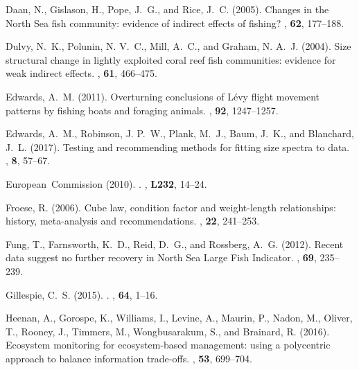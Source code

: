 \begin{thebibliography}{}
Daan, N., Gislason, H., Pope, J.~G., and Rice, J.~C. (2005).
\newblock Changes in the {N}orth {S}ea fish community: evidence of indirect
  effects of fishing?
, {\bf 62}, 177--188.

Dulvy, N.~K., Polunin, N. V.~C., Mill, A.~C., and Graham, N. A.~J. (2004).
\newblock Size structural change in lightly exploited coral reef fish
  communities: evidence for weak indirect effects.
, {\bf 61}, 466--475.

Edwards, A.~M. (2011).
\newblock Overturning conclusions of {{L}}\'evy flight movement patterns by
  fishing boats and foraging animals.
, {\bf 92}, 1247--1257.

Edwards, A.~M., Robinson, J. P.~W., Plank, M.~J., Baum, J.~K., and Blanchard,
  J.~L. (2017).
\newblock Testing and recommending methods for fitting size spectra to data.
, {\bf 8}, 57--67.

{European~Commission} (2010).
.
, {\bf L232}, 14--24.

Froese, R. (2006).
\newblock Cube law, condition factor and weight-length relationships: history,
  meta-analysis and recommendations.
, {\bf 22}, 241--253.

Fung, T., Farnsworth, K.~D., Reid, D.~G., and Rossberg, A.~G. (2012).
\newblock Recent data suggest no further recovery in {N}orth {S}ea {L}arge
  {F}ish {I}ndicator.
, {\bf 69}, 235--239.

Gillespie, C.~S. (2015).
.
, {\bf 64}, 1--16.

Heenan, A., Gorospe, K., Williams, I., Levine, A., Maurin, P., Nadon, M.,
  Oliver, T., Rooney, J., Timmers, M., Wongbusarakum, S., and Brainard, R.
  (2016).
\newblock Ecosystem monitoring for ecosystem-based management: using a
  polycentric approach to balance information trade-offs.
, {\bf 53}, 699--704.


\end{thebibliography}
